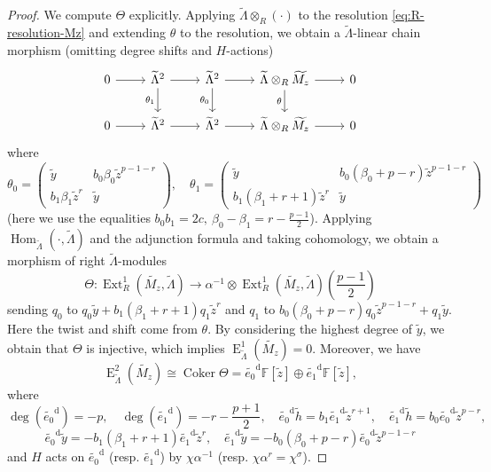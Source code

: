 \documentclass[11pt,a4paper]{article} %
\def\FF{\mathbb{F}}
\def\Coker{\operatorname{Coker}}
\def\d{\operatorname{d}}
\def\deg{\operatorname{deg}}
\def\E{\operatorname{E}}
\def\Ext{\operatorname{Ext}} %
\def\Hom{\operatorname{Hom}}
\begin{document}
\begin{proof}
    We compute $\Theta$ explicitly. Applying $\widetilde{\Lambda}\otimes_R(\cdot)$ to the resolution \eqref{eq:R-resolution-Mz} and extending $\theta$ to the resolution, we obtain a $\widetilde{\Lambda}$-linear chain morphism (omitting degree shifts and $H$-actions)
    \[
    \begin{tikzcd}
	0 & {\widetilde{\Lambda}^2} & {\widetilde{\Lambda}^2} & {\widetilde{\Lambda}\otimes_R \widetilde{M_z}} & 0 \\
	0 & {\widetilde{\Lambda}^2} & {\widetilde{\Lambda}^2} & {\widetilde{\Lambda}\otimes_R \widetilde{M_z}} & 0
	\arrow[from=1-1, to=1-2]
	\arrow[from=1-2, to=1-3]
	\arrow["{\theta_1}"', from=1-2, to=2-2]
	\arrow[from=1-3, to=1-4]
	\arrow["{\theta_0}"', from=1-3, to=2-3]
	\arrow[from=1-4, to=1-5]
	\arrow["\theta"', from=1-4, to=2-4]
	\arrow[from=2-1, to=2-2]
	\arrow[from=2-2, to=2-3]
	\arrow[from=2-3, to=2-4]
	\arrow[from=2-4, to=2-5]
    \end{tikzcd}
    \]
    where 
    \[
    \theta_0=
    \begin{pmatrix}
    \widetilde{y} & b_0\beta_0\widetilde{z}^{p-1-r}\\
    b_1\beta_1\widetilde{z}^r & \widetilde{y}
    \end{pmatrix},
    \quad
    \theta_1=
    \begin{pmatrix}
    \widetilde{y} & b_0(\beta_0+p-r)\widetilde{z}^{p-1-r}\\
    b_1(\beta_1+r+1)\widetilde{z}^r & \widetilde{y}
    \end{pmatrix}
    \]
    (here we use the equalities $b_0b_1=2c,~\beta_0-\beta_1=r-\frac{p-1}{2}$). Applying $\Hom_{\widetilde{\Lambda}}(\cdot,\widetilde{\Lambda})$ and the adjunction formula and taking cohomology, we obtain a morphism of right $\widetilde{\Lambda}$-modules
    \[
    \Theta:\Ext_R^1(\widetilde{M_z},\widetilde{\Lambda})\to\alpha^{-1}\otimes\Ext_R^1(\widetilde{M_z},\widetilde{\Lambda})(\frac{p-1}{2})
    \]
    sending $q_0$ to $q_0\widetilde{y}+b_1(\beta_1+r+1)q_1\widetilde{z}^r$ and $q_1$ to $b_0(\beta_0+p-r)q_0\widetilde{z}^{p-1-r}+q_1\widetilde{y}$. Here the twist and shift come from $\theta$. By considering the highest degree of $\widetilde{y}$, we obtain that $\Theta$ is injective, which implies $\E^1_{\widetilde{\Lambda}}(\widetilde{M_z})=0$. Moreover, we have 
    \[
    \E^2_{\widetilde{\Lambda}}(\widetilde{M_z})\cong\Coker\Theta=\widetilde{e_0}^{\d}\FF[\widetilde{z}]\oplus\widetilde{e_1}^{\d}\FF[\widetilde{z}],
    \]
    where 
    \[
    \deg(\widetilde{e_0}^{\d})=-p,\quad\deg(\widetilde{e_1}^{\d})=-r-\frac{p+1}{2},\quad\widetilde{e_0}^{\d}\widetilde{h}=b_1\widetilde{e_1}^{\d}\widetilde{z}^{r+1},\quad\widetilde{e_1}^{\d}\widetilde{h}=b_0\widetilde{e_0}^{\d}\widetilde{z}^{p-r},
    \]
    \[
    \widetilde{e_0}^{\d}\widetilde{y}=-b_1(\beta_1+r+1)\widetilde{e_1}^{\d}\widetilde{z}^r,\quad\widetilde{e_1}^{\d}\widetilde{y}=-b_0(\beta_0+p-r)\widetilde{e_0}^{\d}\widetilde{z}^{p-1-r}
    \]
    and $H$ acts on $\widetilde{e_0}^{\d}$ (resp. $\widetilde{e_1}^{\d}$) by $\chi\alpha^{-1}$ (resp. $\chi\alpha^r=\chi^\sigma$).
\end{proof}
\end{document}
